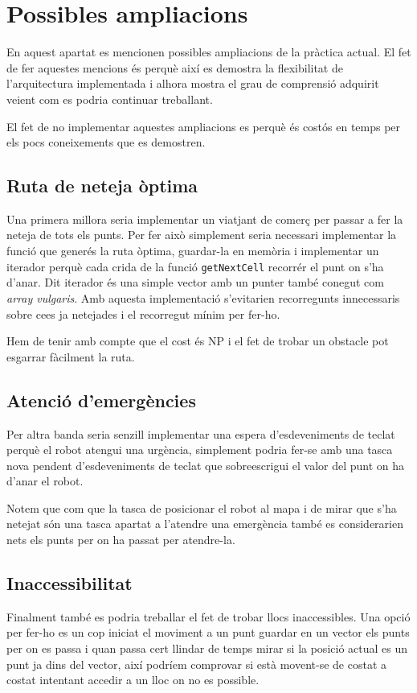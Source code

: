 \section{Possibles ampliacions}

En aquest apartat es mencionen possibles ampliacions de la pràctica actual. El fet de fer aquestes mencions
és perquè així es demostra la flexibilitat de l'arquitectura implementada i alhora mostra el grau
de comprensió adquirit veient com es podria continuar treballant.

El fet de no implementar aquestes ampliacions es perquè és costós en temps per els pocs coneixements
que es demostren.

\subsection{Ruta de neteja òptima}
Una primera millora seria implementar un viatjant de comerç per passar a fer la neteja de tots els punts.
Per fer això simplement seria necessari implementar la funció que generés la ruta òptima, guardar-la en 
memòria i implementar un iterador perquè cada crida de la funció \texttt{getNextCell} recorrér el punt on s'ha d'anar.
Dit iterador és una simple vector amb un punter també conegut com \emph{array vulgaris}.
Amb aquesta implementació s'evitarien recorregunts innecessaris sobre ce\lgem es ja netejades i el recorregut
mínim per fer-ho.

Hem de tenir amb compte que el cost és NP i el fet de trobar un obstacle pot esgarrar fàcilment la ruta.

\subsection{Atenció d'emergències}
Per altra banda seria senzill implementar una espera d'esdeveniments de teclat perquè el robot atengui una urgència,
simplement podria fer-se amb una tasca nova pendent d'esdeveniments de teclat que sobreescrigui el valor del  punt
on ha d'anar el robot.

Notem que com que la tasca de posicionar el robot al mapa i de mirar que s'ha netejat són una tasca apartat
a l'atendre una emergència també es considerarien nets els punts per on ha passat per atendre-la.

\subsection{Inaccessibilitat}
Finalment també es podria treballar el fet de trobar llocs inaccessibles. Una opció per fer-ho
es un cop iniciat el moviment a un punt guardar en un vector els punts per on es passa i quan passa
cert llindar de temps mirar si la posició actual es un punt ja dins del vector, així podríem comprovar
si està movent-se de costat a costat intentant accedir a un lloc on no es possible.

